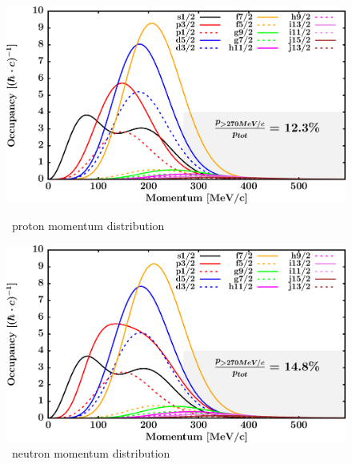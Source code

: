 \begin{figure}[hbtp]
    \centering
    \begin{minipage}{0.45\textwidth}
        \centering
        \includegraphics[width=\textwidth]{figures/ni58_protonLJMomentumDistIntegral.png}
        \caption*{\niEight\ proton momentum distribution}
        \label{DOMFitData_ni58_proton_momentumDist}
    \end{minipage}\hspace{6pt}
    \begin{minipage}{0.45\textwidth}
        \centering
        \includegraphics[width=\textwidth]{figures/ni58_neutronLJMomentumDistIntegral.png}
        \caption*{\niEight\ neutron momentum distribution}
        \label{DOMFitData_ni58_neutron_momentumDist}
    \end{minipage}
\end{figure}
\vspace{0.3in}
